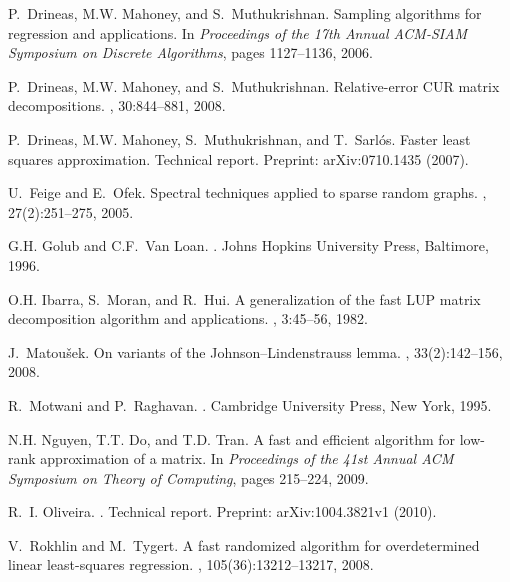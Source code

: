 \documentclass[11pt]{article}
\begin{document}
\begin{thebibliography}{10}
P.~Drineas, M.W. Mahoney, and S.~Muthukrishnan.
\newblock Sampling algorithms for  regression and applications.
\newblock In {\em Proceedings of the 17th Annual ACM-SIAM Symposium on Discrete
  Algorithms}, pages 1127--1136, 2006.

P.~Drineas, M.W. Mahoney, and S.~Muthukrishnan.
\newblock Relative-error {CUR} matrix decompositions.
, 30:844--881,
  2008.

P.~Drineas, M.W. Mahoney, S.~Muthukrishnan, and T.~Sarl\'{o}s.
\newblock Faster least squares approximation.
\newblock Technical report.
\newblock Preprint: arXiv:0710.1435 (2007).

U.~Feige and E.~Ofek.
\newblock Spectral techniques applied to sparse random graphs.
, 27(2):251--275, 2005.

G.H. Golub and C.F.~Van Loan.
.
\newblock Johns Hopkins University Press, Baltimore, 1996.

O.H. Ibarra, S.~Moran, and R.~Hui.
\newblock A generalization of the fast {LUP} matrix decomposition algorithm and
  applications.
, 3:45--56, 1982.

J.~Matou\v{s}ek.
\newblock On variants of the {J}ohnson--{L}indenstrauss lemma.
, 33(2):142--156, 2008.

R.~Motwani and P.~Raghavan.
.
\newblock Cambridge University Press, New York, 1995.

N.H. Nguyen, T.T. Do, and T.D. Tran.
\newblock A fast and efficient algorithm for low-rank approximation of a
  matrix.
\newblock In {\em Proceedings of the 41st Annual ACM Symposium on Theory of
  Computing}, pages 215--224, 2009.

R.~I. Oliveira.
.
\newblock Technical report.
\newblock Preprint: arXiv:1004.3821v1 (2010).

V.~Rokhlin and M.~Tygert.
\newblock A fast randomized algorithm for overdetermined linear least-squares
  regression.
, 105(36):13212--13217, 2008.


\end{thebibliography}
\end{document}

